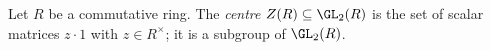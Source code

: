 Let $R$ be a commutative ring. The \emph{centre} $Z(R)\subseteq\GL_2(R)$ is the set of scalar matrices
$z\cdot1$ with $z\in R^\times$; it is a subgroup of $\GL_2(R)$.
